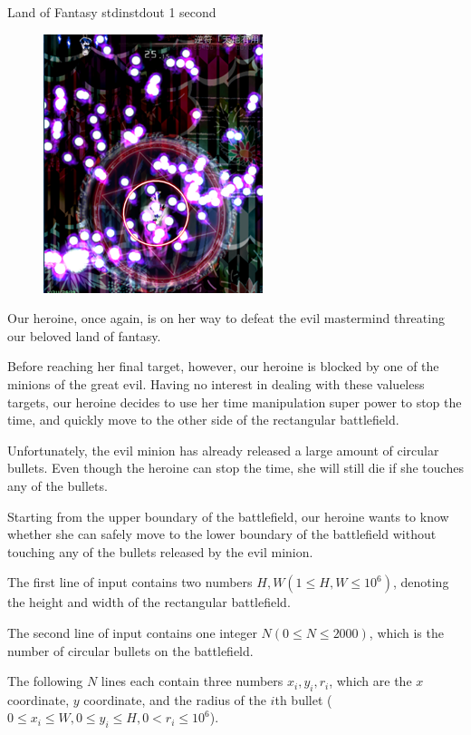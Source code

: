 \begin{problem}{Land of Fantasy}
{stdin}{stdout}
{1 second}{}{}

\begin{figure}
    \includegraphics[scale=0.8]{danmaku.png}
\end{figure}
Our heroine, once again, is on her way to defeat the evil mastermind threating 
our beloved land of fantasy. 


Before reaching her final target, however, our heroine is blocked by one of
the minions of the great evil. Having no interest in dealing with these
valueless targets, our heroine decides to use her time manipulation super power
to stop the time, and quickly move to the other side of the 
rectangular battlefield.

Unfortunately, the evil minion has already released a large amount of circular 
bullets. Even though the heroine can stop the time, she will still die if she 
touches any of the bullets.

Starting from the upper boundary of the battlefield, our heroine wants to
know whether she can safely move to the lower boundary of the battlefield
without touching any of the bullets released by the evil minion.

\InputFile

The first line of input contains two numbers $H, W (1 \le H, W \le 10^6)$,
denoting the height and width of the rectangular battlefield.

The second line of input contains one integer $N (0 \le N \le 2000)$, which
is the number of circular bullets on the battlefield.

The following $N$ lines each contain three numbers $x_i, y_i, r_i$, which are 
the $x$ coordinate, $y$ coordinate, and the radius of the $i$th bullet
($0 \le x_i \le W, 0 \le y_i \le H, 0 < r_i \le 10^6$).


\end{problem}
